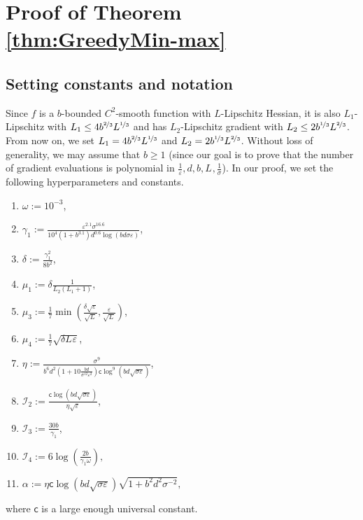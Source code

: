 \documentclass[11pt,letterpaper]{article}
\renewcommand{\epsilon}{\varepsilon}
\newcommand{\coloneqq}{:=}
\begin{document}
\vspace{-3mm}

\section{Proof of Theorem \ref{thm:GreedyMin-max}} \label{sec_proof_of_main_theorem}

\subsection{Setting constants and notation} \label{section:constants}
Since $f$ is a $b$-bounded $C^2$-smooth function with $L$-Lipschitz Hessian, it is also $L_1$-Lipschitz with  $L_1 \leq 4 b^{\nicefrac{2}{3}} L^{\nicefrac{1}{3}}$ and has $L_2$-Lipschitz gradient with $L_2 \leq 2 b^{\nicefrac{1}{3}} L^{\nicefrac{2}{3}}$.
%
From now on, we set $L_1 = 4 b^{\nicefrac{2}{3}} L^{\nicefrac{1}{3}}$ and $L_2 = 2 b^{\nicefrac{1}{3}} L^{\nicefrac{2}{3}}$.
%
Without loss of generality, we may assume that $b \geq 1$ (since our goal is to prove that the number of gradient evaluations is polynomial in $\frac{1}{\epsilon}, d, b, L_{}, \frac{1}{\sigma}$).
%
%
% 
In our proof, we set the following hyperparameters and constants.
%
%
\begin{enumerate}
%
    \item $\omega \coloneqq 10^{-3}$, 
%
\item $\gamma_1 \coloneqq \frac{\epsilon^{2.1} \sigma^{16.6}}{10^4 (1+b^{3.1}) d^{0.6} \log(b d \sigma \epsilon)}$, 
%
\item $\delta \coloneqq \frac{\gamma_1^2}{8 b^2}$, 
%
\item  $\mu_1 \coloneqq \delta \frac{1}{L_2(L_1+1)}$,
%
\item $\mu_3 \coloneqq \frac{1}{7}  \min\left( \frac{\delta \sqrt{\epsilon}}{\sqrt{L_{}}}, \frac{\epsilon}{\sqrt{L_{}}} \right)$, 
%
 \item $\mu_4 \coloneqq \frac{1}{7} \sqrt{\delta L_{} \epsilon}$, 
%
%
\item $\eta \coloneqq \frac{\sigma^9 }{  b^6 d^2 \left(1+ 10\frac{b d}{\sigma^{12}\epsilon^2}\right) \mathsf{c} \log^9( bd\sqrt{\sigma \epsilon})}$,  
%
\item $\mathcal{I}_2 \coloneqq \frac{\mathsf{c} \log(bd\sqrt{\sigma \epsilon})}{\eta \sqrt{\epsilon}}$, 
%
\item $\mathcal{I}_3 \coloneqq \frac{30 b}{\gamma_1}$,  
%
\item $\mathcal{I}_4 \coloneqq 6\log\left(\frac{2 b}{\gamma_1 \omega}\right),$ 
%
 \item$\alpha \coloneqq \eta \mathsf{c}\log( bd\sqrt{\sigma \epsilon}) \sqrt{1+ b^2 d^2 \sigma^{-2}},$
 \end{enumerate}
%
 where $\mathsf{c}$ is a large enough universal constant.
\end{document}

